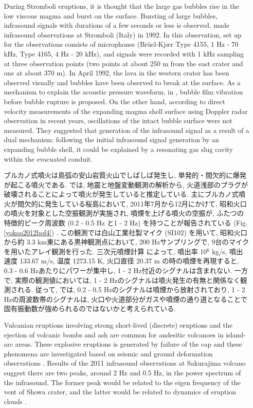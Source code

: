 \documentclass[12pt]{article}
\begin{document}
During Stromboli eruptions, it is thought that the large gas bubbles rise in the low viscous magma and burst on the surface.
Bursting of large bubbles, infrasound signals with durations of a few seconds or less is observed.
\cite{Vergniolle1996b} made infrasound observations at Stromboli (Italy) in 1992. 
In this observation, set up for the observations consists of microphones (Br\"uel-Kj\ae r Type 4155, 1 Hz - 70 kHz, Type 4165, 4 Hz - 20 kHz), and signals were recorded with 1 kHz sampling at three observation points (two points at about 250 m from the east crater and one at about 370 m).
In April 1992, the lava in the western crater has been observed visually and bubbles have been observed to break at the surface.
As a mechanism to explain the acoustic pressure waveform, in \cite {Vergniolle1996c}, bubble film vibration before bubble rupture is proposed.
On the other hand, according to direct velocity measurements of the expanding magma shell surface using Doppler radar observation in recent years, oscillations of the intact bubble surface were not measured.
They suggested that generation of the infrasound signal as a result of a dual mechanism: following the initial infrasound signal generation by an expanding bubble shell, it could be explained by a resonating gas slug cavity within the evacuated conduit.


ブルカノ式噴火は島弧の安山岩質火山でしばしば発生し, 単発的・間欠的に爆発が起こる噴火である. \cite{Iguchi2008}では, 地震と地盤変動観測の解析から, 火道浅部のプラグが破壊されることによって噴火が発生していると推定している.
主にブルカノ式噴火が間欠的に発生している桜島において, 2011年7月から12月にかけて, 昭和火口の噴火を対象とした空振観測が実施され, 噴煙を上げる噴火の空振が, ふたつの特徴的ピーク周波数 (0.2 - 0.5 Hz と1 - 2 Hz) を持つことが報告されている (Fig. \ref{yokoo2012bof4}) \citep{yokoo2012bo}. この観測では白山工業社製マイク (SI102) を用いて, 昭和火口から約 3.3 km東にある黒神観測点において, 200 Hzサンプリングで, 9台のマイクを用いたアレイ観測を行った.
三次元噴煙計算 \citep{Suzuki2005} によって, 噴出率 10$^6$ kg/s, 噴出速度 133.67 m/s, 温度 1273.15 K, 火口直径 20.37 m の時の噴煙を再現すると, 0.3 - 0.6 Hzあたりにパワーが集中し, 1 - 2 Hz付近のシグナルは含まれない. 
一方で, 実際の観測値においては, 1 - 2 Hzのシグナルは噴火発生の有無と関係なく観測される. 従って, \cite{yokoo2012bo} では, 0.2 - 0.5 Hzのシグナルは噴煙から放射されており, 1 - 2 Hzの周波数帯のシグナルは, 火口や火道部分がガスや噴煙の通り道となることで固有振動数が強められるのではないかと考えられている. 

Vulcanian eruptions involving strong short-lived (discrete) eruptions and the ejection of volcanic bombs and ash are common for andesitic volcanoes in island-arc areas.
These explosive eruptions is generated by failure of the cap and these phenomena are investigated based on seismic and ground deformation observations \citep{Iguchi2008}.
Results of the 2011 infrasound observations at Sakurajima volcano suggest there are two peaks, around 2 Hz and 0.5 Hz, in the power spectrum of the infrasound. 
The former peak would be related to the eigen frequency of the vent of Showa crater, and the latter would be related to dynamics of eruption clouds \citep{yokoo2012bo}. 
\end{document}
